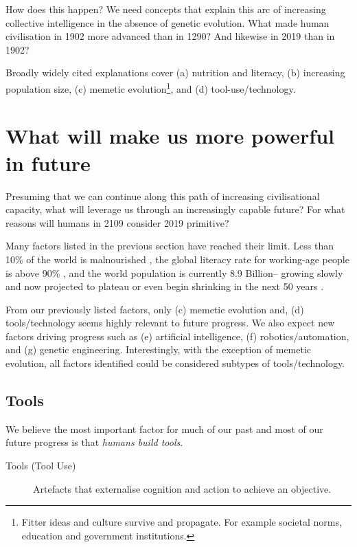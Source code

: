 \documentclass[logo,bsc,singlespacing,parskip]{infthesis}
\begin{document}
How does this happen?
We need concepts that explain this arc of increasing collective intelligence in the absence of genetic evolution.
What made human civilisation in 1902 more advanced than in 1290?
And likewise in 2019 than in 1902?

Broadly widely cited explanations cover (a) nutrition and literacy, (b) increasing population size, (c) memetic evolution\footnote{Fitter ideas and culture survive and propagate. For example societal norms, education and government institutions.}, and (d) tool-use/technology.

\section{What will make us more powerful in future}
\label{sec:org63310d1}
Presuming that we can continue along this path of increasing civilisational capacity, what will leverage us through an increasingly capable future?
For what reasons will humans in 2109 consider 2019 primitive?

Many factors listed in the previous section have reached their limit.
Less than 10\% of the world is malnourished \autocite{OurWorldData}, the global literacy rate for working-age people is above 90\% \autocite{OurWorldData}, and the world population is currently 8.9 Billion-- growing slowly and now projected to plateau or even begin shrinking in the next 50 years \autocite{OurWorldData}.

From our previously listed factors, only (c) memetic evolution and, (d) tools/technology seems highly relevant to future progress.
We also expect new factors driving progress such as (e) artificial intelligence, (f) robotics/automation, and (g) genetic engineering.
Interestingly, with the exception of memetic evolution, all factors identified could be considered subtypes of tools/technology.

\subsection{Tools}
\label{sec:org636ef9c}
We believe the most important factor for much of our past and most of our future progress is that \emph{humans build tools}.

\begin{mdframed}
\begin{description}
\item[{Tools (Tool Use)}] Artefacts that externalise cognition and action to achieve an objective.
\end{description}
\end{mdframed}
\end{document}
